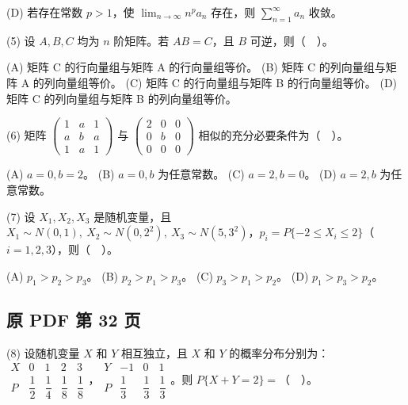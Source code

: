\documentclass[UTF8,12pt]{ctexart}
\begin{document}
(D) 若存在常数 \(\displaystyle p>1\)，使 \(\displaystyle \lim_{n\to\infty}n^pa_n\) 存在，则 \(\displaystyle \sum_{n=1}^{\infty}a_n\) 收敛。


(5) 设 \(\displaystyle A,\allowbreak B,\allowbreak C\) 均为 \(\displaystyle n\) 阶矩阵。若 \(\displaystyle AB=C\)，且 \(\displaystyle B\) 可逆，则（　）。


(A) 矩阵 C 的行向量组与矩阵 A 的行向量组等价。 (B) 矩阵 C 的列向量组与矩阵 A 的列向量组等价。 (C) 矩阵 C 的行向量组与矩阵 B 的行向量组等价。 (D) 矩阵 C 的列向量组与矩阵 B 的列向量组等价。


(6) 矩阵 \(\displaystyle \begin{pmatrix}1&a&1\\a&b&a\\1&a&1\end{pmatrix}\) 与 \(\displaystyle \begin{pmatrix}2&0&0\\0&b&0\\0&0&0\end{pmatrix}\) 相似的充分必要条件为（　）。


(A) \(\displaystyle a=0,\allowbreak b=2\)。 (B) \(\displaystyle a=0,\allowbreak b\) 为任意常数。 (C) \(\displaystyle a=2,\allowbreak b=0\)。 (D) \(\displaystyle a=2,\allowbreak b\) 为任意常数。


(7) 设 \(\displaystyle X_1,\allowbreak X_2,\allowbreak X_3\) 是随机变量，且 \(\displaystyle X_1\sim N(0,\allowbreak 1),\allowbreak \ X_2\sim N(0,\allowbreak 2^2),\allowbreak \ X_3\sim N(5,\allowbreak 3^2)\)，\(\displaystyle p_i=P\{-2\leq X_i\leq2\}\)（\(\displaystyle i=1,\allowbreak 2,\allowbreak 3\)），则（　）。


(A) \(\displaystyle p_1>p_2>p_3\)。 (B) \(\displaystyle p_2>p_1>p_3\)。 (C) \(\displaystyle p_3>p_1>p_2\)。 (D) \(\displaystyle p_1>p_3>p_2\)。


\clearpage

\subsection*{原 PDF 第 32 页}

(8) 设随机变量 \(\displaystyle X\) 和 \(\displaystyle Y\) 相互独立，且 \(\displaystyle X\) 和 \(\displaystyle Y\) 的概率分布分别为：\(\displaystyle \begin{array}{c|cccc}X&0&1&2&3\\\hline P&\dfrac{\displaystyle 1}{\displaystyle 2}&\dfrac{\displaystyle 1}{\displaystyle 4}&\dfrac{\displaystyle 1}{\displaystyle 8}&\dfrac{\displaystyle 1}{\displaystyle 8}\end{array}\)，\(\displaystyle \begin{array}{c|ccc}Y&-1&0&1\\\hline P&\dfrac{\displaystyle 1}{\displaystyle 3}&\dfrac{\displaystyle 1}{\displaystyle 3}&\dfrac{\displaystyle 1}{\displaystyle 3}\end{array}\)。则 \(\displaystyle P\{X+Y=2\}=\)（　）。
\end{document}
